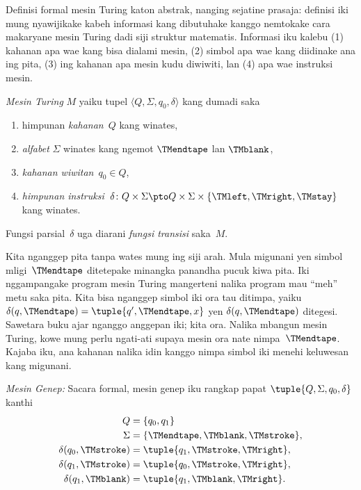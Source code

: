 \documentclass[../../../include/open-logic-section]{subfiles}
\begin{document}

\begin{explain}
Definisi formal mesin Turing katon abstrak,
nanging sejatine prasaja: definisi iki
mung nyawijikake kabeh informasi kang
dibutuhake kanggo nemtokake cara makaryane
mesin Turing dadi siji struktur matematis.
Informasi iku kalebu (1) kahanan apa wae
kang bisa dialami mesin, (2) simbol apa
wae kang diidinake ana ing pita, (3)
ing kahanan apa mesin kudu diwiwiti,
lan (4) apa wae instruksi mesin.
\end{explain}

\begin{defn}
\emph{Mesin Turing} $M$ yaiku tupel
$\langle Q, \Sigma, q_0,
\delta\rangle$ kang dumadi saka
\begin{enumerate}
\item himpunan \emph{kahanan}~$Q$ kang winates,
\item \emph{alfabet} $\Sigma$ winates kang ngemot
  $\TMendtape$ lan $\TMblank$,
\item \emph{kahanan wiwitan}~$q_0 \in Q$,
\item \emph{himpunan instruksi}~$\delta\colon Q \times \Sigma
  \pto Q \times \Sigma \times \{\TMleft, \TMright, \TMstay\}$ kang winates.
\end{enumerate}
Fungsi parsial~$\delta$ uga diarani
\emph{fungsi transisi} saka~$M$.
\end{defn}

\begin{explain}
Kita nganggep pita tanpa wates mung
ing siji arah. Mula migunani yen simbol
mligi~$\TMendtape$ ditetepake minangka
panandha pucuk kiwa pita. Iki nggampangake
program mesin Turing mangerteni nalika
program mau ``meh'' metu saka pita.
Kita bisa nganggep simbol iki ora tau
ditimpa, yaiku $\delta(q,\TMendtape) = \tuple{q', \TMendtape, x}$
yen $\delta(q,\TMendtape)$ ditegesi.
Sawetara buku ajar nganggo anggepan iki;
kita ora. Nalika mbangun mesin Turing,
kowe mung perlu ngati-ati supaya mesin
ora nate nimpa~$\TMendtape$. Kajaba iku,
ana kahanan nalika idin kanggo nimpa
simbol iki menehi keluwesan kang migunani.
\end{explain}

\begin{ex}
\emph{Mesin Genep:} Sacara formal,
mesin genep iku rangkap papat
$\tuple{Q, \Sigma, q_0, \delta}$ kanthi
\begin{align*}
Q & = \{ q_0, q_1 \} \\
\Sigma & = \{ \TMendtape, \TMblank, \TMstroke \}, \\
\delta(q_0, \TMstroke) & = \tuple{q_1, \TMstroke, \TMright},\\
\delta(q_1, \TMstroke) & = \tuple{q_0, \TMstroke, \TMright},\\
\delta(q_1, \TMblank)  & = \tuple{q_1, \TMblank, \TMright}.
\end{align*}
\end{ex}
\end{document}
